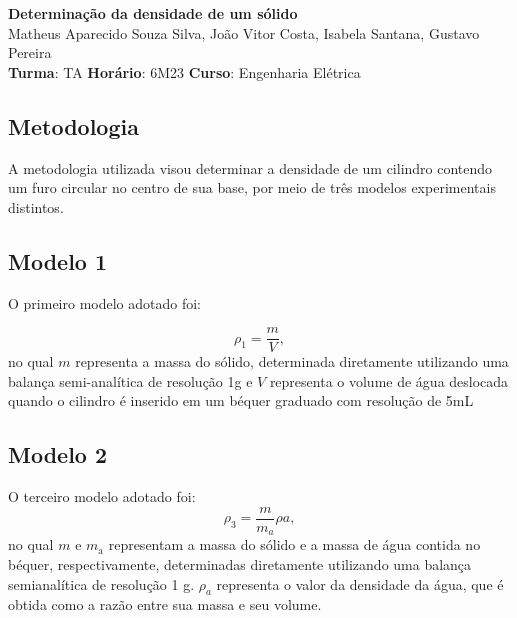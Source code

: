 \documentclass{article}
\begin{document}
\begin{center} %
    \huge %
    \textbf{Determinação da densidade de um sólido} 
    \normalsize
    \vspace{10pt}
    \\
    Matheus Aparecido Souza Silva, João Vitor Costa, Isabela Santana, Gustavo Pereira
    \\
    \vspace{5pt}
    \textbf{Turma}: TA \textbf{Horário}: 6M23  \textbf{Curso}: Engenharia Elétrica
\end{center} 

\begin{multicols*}{2} %

    \section{Metodologia}
    A metodologia utilizada visou determinar a densidade
    de um cilindro contendo um furo circular no centro de
    sua base, por meio de três modelos experimentais distintos.
    \subsection{Modelo 1}
    O primeiro modelo adotado foi: 

    \begin{equation}
        \rho_1 = \frac{m}{V},
    \end{equation} no qual $m$ representa a massa do sólido, determinada diretamente utilizando uma balança semi-analítica de resolução 1g e $V$
    representa o volume de água deslocada quando o cilindro é inserido em um béquer graduado com resolução de 5mL

    \subsection{Modelo 2}
    O terceiro modelo adotado foi:  
    \begin{equation}
        \rho_3 = \frac{m}{m_a} \rho a,
    \end{equation}  no qual $m$ e $m_{\text{a}}$ representam a massa do sólido e a massa de água contida no béquer, respectivamente, determinadas diretamente utilizando uma balança semianalítica de resolução 1 g. $\rho_{a}$ representa o valor da densidade da água, que é obtida como a razão entre sua massa e seu volume.


\end{multicols*}
\end{document}
